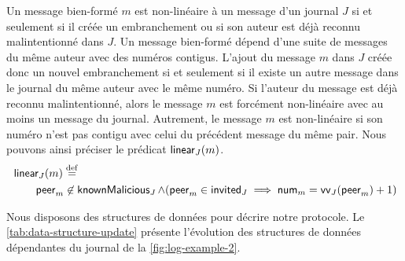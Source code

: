 Un message bien-formé $m$ est non-linéaire à un message d'un journal $J$ si et seulement si il créée un embranchement ou si son auteur est déjà reconnu malintentionné dans $J$.
%
Un message bien-formé dépend d'une suite de messages du même auteur avec des numéros contigus.
L'ajout du message $m$ dans $J$ créée donc un nouvel embranchement si et seulement si il existe un autre message dans le journal du même auteur avec le même numéro.
Si l'auteur du message est déjà reconnu malintentionné, alors le message $m$ est forcément non-linéaire avec au moins un message du journal.
Autrement, le message $m$ est non-linéaire si son numéro n'est pas contigu avec celui du précédent message du même pair.
Nous pouvons ainsi préciser le prédicat $\operatorname{\mathsf{linear}}_J(m)$.
%
%
\begin{equation}\begin{split}
\MoveEqLeft\trm{linear}_J(m) \defeq\\
&\trm{peer}_m \not\in \trm{knownMalicious}_J \land (\trm{peer}_m \in \trm{invited}_J \implies \trm{num}_m = \trm{vv}_J(\trm{peer}_m) + 1)
\end{split}\end{equation}

Nous disposons des structures de données pour décrire notre protocole.
Le \autoref{tab:data-structure-update} présente l'évolution des structures de données dépendantes du journal de la \autoref{fig:log-example-2}.

